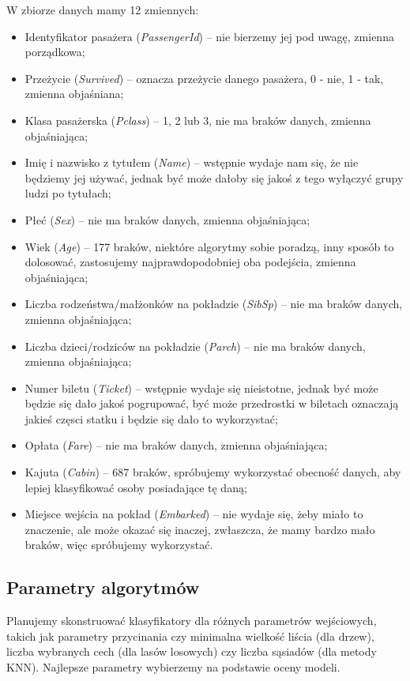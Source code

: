 \documentclass{article}
\begin{document}
W zbiorze danych mamy 12 zmiennych:
\begin{itemize}
\item Identyfikator pasażera ({\itshape PassengerId}) -- nie bierzemy jej pod uwagę, zmienna porządkowa;
\item Przeżycie ({\itshape Survived}) -- oznacza przeżycie danego pasażera, 0 - nie, 1 - tak, zmienna objaśniana;
\item Klasa pasażerska ({\itshape Pclass}) -- 1, 2 lub 3, nie ma braków danych, zmienna objaśniająca;
\item Imię i nazwisko z tytułem ({\itshape Name}) -- wstępnie wydaje nam się, że nie będziemy jej używać, jednak być może dałoby się jakoś z tego wyłączyć grupy ludzi po tytułach;
\item Płeć ({\itshape Sex}) -- nie ma braków danych, zmienna objaśniająca;
\item Wiek ({\itshape Age}) -- 177 braków, niektóre algorytmy sobie poradzą, inny sposób to dolosować, zastosujemy najprawdopodobniej oba podejścia, zmienna objaśniająca;
\item Liczba rodzeństwa/małżonków na pokładzie ({\itshape SibSp}) -- nie ma braków danych, zmienna objaśniająca;
\item Liczba dzieci/rodziców na pokładzie ({\itshape Parch}) -- nie ma braków danych, zmienna objaśniająca;
\item Numer biletu ({\itshape Ticket}) -- wstępnie wydaje się nieistotne, jednak być może będzie się dało jakoś pogrupować, być może przedrostki w biletach oznaczają jakieś częsci statku i będzie się dało to wykorzystać;
\item Opłata ({\itshape Fare}) -- nie ma braków danych, zmienna objaśniająca;
\item Kajuta ({\itshape Cabin}) -- 687 braków, spróbujemy wykorzystać obecność danych, aby lepiej klasyfikować osoby posiadające tę daną;
\item Miejsce wejścia na pokład ({\itshape Embarked}) -- nie wydaje się, żeby miało to znaczenie, ale może okazać się inaczej, zwłaszcza, że mamy bardzo mało braków, więc spróbujemy wykorzystać.
\end{itemize}

\subsection{Parametry algorytmów}
Planujemy skonstruować klasyfikatory dla różnych parametrów wejściowych, takich jak parametry przycinania czy minimalna wielkość liścia (dla drzew), liczba wybranych cech (dla lasów losowych) czy liczba sąsiadów (dla metody KNN). Najlepsze parametry wybierzemy na podstawie oceny modeli.
\end{document}
